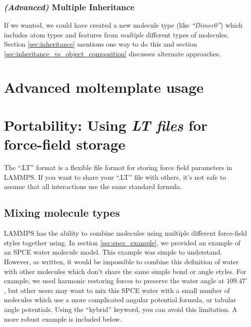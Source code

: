 \documentclass[11pt]{article}
\begin{document}
\subsubsection*{\textit{(Advanced)} Multiple Inheritance}
If we wanted, we could have created a new molecule type 
(like \textit{``Dimer0''}) 
which includes atom types and features from 
\textit{multiple} different types of molecules.
Section \ref{sec:inheritance} mentions one way to do this
and section \ref{sec:inheritance_vs_object_composition}
discusses alternate approaches.








\section*{Advanced moltemplate usage}



\section{Portability: Using \textit{LT files} for force-field storage}
\label{sec:spce_example_robust}
The ``.LT'' format is a flexible file format
for storing force field parameters in LAMMPS.
If you want to share your ``.LT'' file with others, it's 
not safe to assume that all interactions use the same standard formula.

\subsection{Mixing molecule types}
LAMMPS has the ability to combine molecules using multiple different 
force-field styles together using. 
In section \ref{sec:spce_example}, 
we provided an example of an SPCE water molecule model.
This example was simple to understand.
However, as written, it would be impossible to combine this definition of water 
with other molecules which don't share the same simple bond or angle styles.
For example, we used harmonic restoring forces to preserve the water angle 
at $109.47^\circ$, but other users may want to mix this SPCE water with a small 
number of molecules which use a more complicated angular potential formula,
or tabular angle potentials.
Using the ``hybrid'' keyword, you can avoid this limitation. 
A more robust example is included below.
\end{document}
